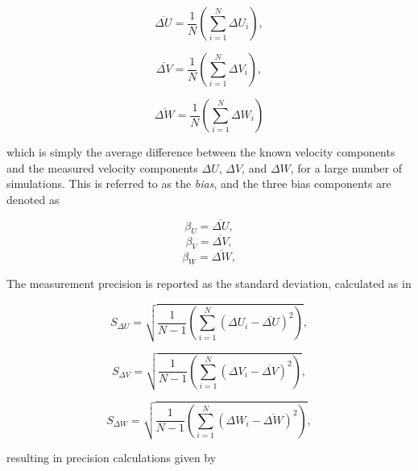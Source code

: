 \begin{equation}
\overline{\Delta U} = \frac{1}{N} \left(\sum_{i=1}^N \Delta U_i \right),
\label{eq:Uerror}
\end{equation}

\begin{equation}
\overline{\Delta V} = \frac{1}{N} \left(\sum_{i=1}^N \Delta V_i \right),
\label{eq:Verror}
\end{equation}

\begin{equation}
\overline{\Delta W} = \frac{1}{N} \left(\sum_{i=1}^N \Delta W_i \right)
\label{eq:Werror}
\end{equation}

which is simply the average difference between the known velocity components 
and the measured velocity components $\Delta U$, $\Delta V$, and $\Delta W$, 
for a large number of simulations. This is referred to as the \textit{bias}, 
and the three bias components are denoted as

\begin{equation}
\beta_{U} = \overline{\Delta U},
\label{eq:Ubias}
\end{equation}
\begin{equation}
\beta_{V} = \overline{\Delta V},
\label{eq:Vbias}
\end{equation}
\begin{equation}
\beta_{W} = \overline{\Delta W},
\label{eq:Wbias}
\end{equation}

The measurement precision is reported as the  
standard deviation, calculated as in 
	
\begin{equation}
S_{\Delta U} = \sqrt{\frac{1}{N-1} \left(\sum_{i=1}^N (\Delta U_i - 
\overline{\Delta U})^2 \right)},
\label{eq:Usd}
\end{equation}

\begin{equation}
S_{\Delta V} = \sqrt{\frac{1}{N-1} \left(\sum_{i=1}^N (\Delta V_i - 
	\overline{\Delta V})^2 \right)},
\label{eq:Vsd}
\end{equation}

\begin{equation}
S_{\Delta W} = \sqrt{\frac{1}{N-1} \left(\sum_{i=1}^N (\Delta W_i - 
	\overline{\Delta W})^2 \right)},
\label{eq:Wsd}
\end{equation}

\noindent
resulting in precision calculations given by 
	
